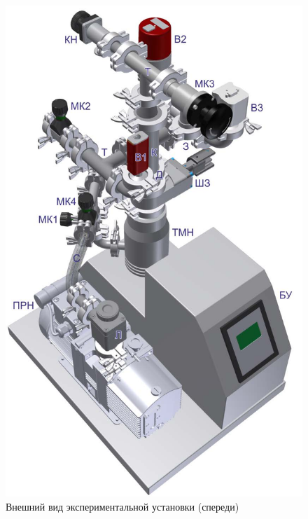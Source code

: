 \documentclass[a4paper,12pt]{article}
\begin{document}
\begin{figure}[h]
\begin{center}
\begin{minipage}[h]{0.45\linewidth}
	\includegraphics[width=0.9\linewidth]{fig1.jpg}
	\caption{Внешний вид экспериментальной установки (спереди)} 
	\label{front}
\end{minipage}
\hfill
\begin{minipage}[h]{0.45\linewidth}

\end{minipage}
\end{center}
\end{figure}
\end{document}
